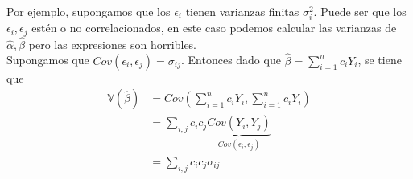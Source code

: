 \documentclass[10pt]{article}
\theoremstyle{plain}
\theoremstyle{definition}
\begin{document}
Por ejemplo, supongamos que los $\epsilon_{i}$ tienen varianzas finitas $\sigma_{i}^2$. Puede ser que los $\epsilon_{i},\epsilon_{j}$ estén o no correlacionados, en este caso podemos calcular las varianzas de $\hat{\alpha},\hat{\beta}$ pero las expresiones son horribles.\\

Supongamos que $Cov(\epsilon_{i},\epsilon_{j}) = \sigma_{ij}$. Entonces dado que $\hat{\beta} = \sum_{i=1}^n c_{i} Y_{i}$, se tiene que
\begin{align*}
\mathbb{V}(\hat{\beta}) &= Cov(\sum_{i=1}^n c_{i} Y_{i},\sum_{i=1}^n c_{i} Y_{i})\\
&= \sum_{i,j} c_{i}c_{j} \underbrace{Cov (Y_{i},Y_{j})}_{Cov (\epsilon_{i},\epsilon_{j})}\\
&= \sum_{i,j} c_{i}c_{j}\sigma_{ij}
\end{align*}
\end{document}
